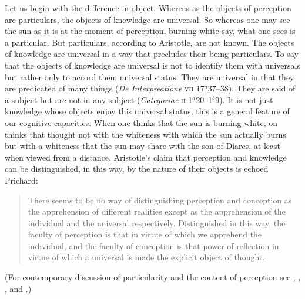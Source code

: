 Let us begin with the difference in object. Whereas as the objects of perception are particulars, the objects of knowledge are universal. So whereas one may see the sun as it is at the moment of perception, burning white say, what one sees is a particular. But particulars, according to Aristotle, are not known. The objects of knowledge are universal in a way that precludes their being particulars. To say that the objects of knowledge are universal is not to identify them with universals but rather only to accord them universal status. They are universal in that they are predicated of many things (\emph{De Interpreatione} \textsc{vii} 17\( ^{a} \)37--38). They are said of a subject but are not in any subject (\emph{Categoriae} \textsc{ii} 1\( ^{a} \)20--1\( ^{b} \)9). It is not just knowledge whose objects enjoy this universal status, this is a general feature of our cognitive capacities. When one thinks that the sun is burning white, on thinks that thought not with the whiteness with which the sun actually burns but with a whiteness that the sun may share with the son of Diares, at least when viewed from a distance. Aristotle's claim that perception and knowledge can be distinguished, in this way, by the nature of their objects is echoed Prichard:
\begin{quote}
	There seems to be no way of distinguishing perception and conception as the apprehension of different realities except as the apprehension of the individual and the universal respectively. Distinguished in this way, the faculty of perception is that in virtue of which we apprehend the individual, and the faculty of conception is that power of reflection in virtue of which a universal is made the explicit object of thought. \citep[]{Prichard:1909yg}
\end{quote}
(For contemporary discussion of particularity and the content of perception see \citealt{Brewer:2008fk}, \citealt{Martin:2002jb}, \citealt{Soteriou:2000iz,Soteriou:2005fk}, and \citealt{Travis:2005ys}.)

